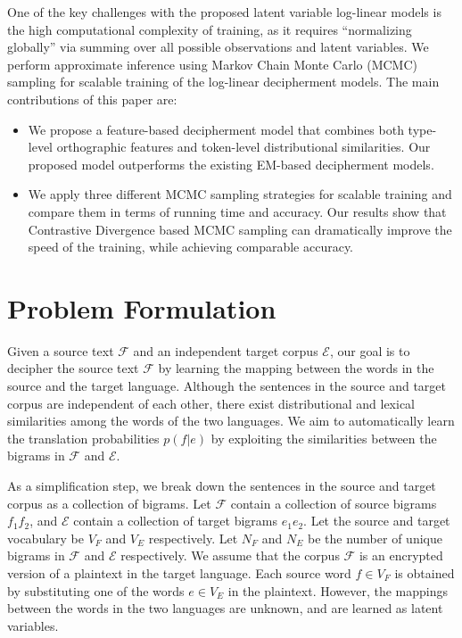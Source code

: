 One of the key challenges with the proposed latent variable log-linear models is the high computational complexity of training, as it requires ``normalizing globally'' via summing over all possible observations and latent variables. 
We perform approximate inference using Markov Chain Monte Carlo (MCMC) sampling for scalable training of the log-linear decipherment models. 
The main contributions of this paper are:
\begin{itemize}
\item We propose a feature-based decipherment model that combines both type-level orthographic features and token-level distributional similarities. Our proposed model outperforms the existing EM-based decipherment models.
\item We apply three different MCMC sampling strategies for scalable training and compare them in terms of running time and accuracy. 
Our results show that Contrastive Divergence based MCMC sampling can dramatically improve the speed of the training, while achieving comparable accuracy.
\end{itemize}
\section{Problem Formulation}
Given a source text $\mathcal{F}$ and an independent target corpus $\mathcal{E}$, our goal is to decipher the source text $\mathcal{F}$ by learning the mapping between the words in the source and the target language. 
Although the sentences in the source and target corpus are independent of each other, there exist distributional and lexical similarities among the words of the two languages. 
We aim to automatically learn the translation probabilities $p(f|e)$ by exploiting the similarities between the bigrams in $\mathcal{F}$ and $\mathcal{E}$.

As a simplification step, we break down the sentences in the source and target corpus as a collection of bigrams. 
Let $\mathcal{F}$ contain a collection of source bigrams $f_1 f_2$, and $\mathcal{E}$ contain a collection of target bigrams $e_1 e_2$. 
Let the source and target vocabulary be $V_F$ and $V_E$ respectively. 
Let $N_F$ and $N_E$ be the number of unique bigrams in $\mathcal{F}$ and $\mathcal{E}$ respectively.
We assume that the corpus $\mathcal{F}$ is an encrypted version of a plaintext in the target language.
Each source word $f \in V_F$ is obtained by substituting one of the words $e \in V_E$ in the plaintext. 
However, the mappings between the words in the two languages are unknown, and are learned as latent variables.

